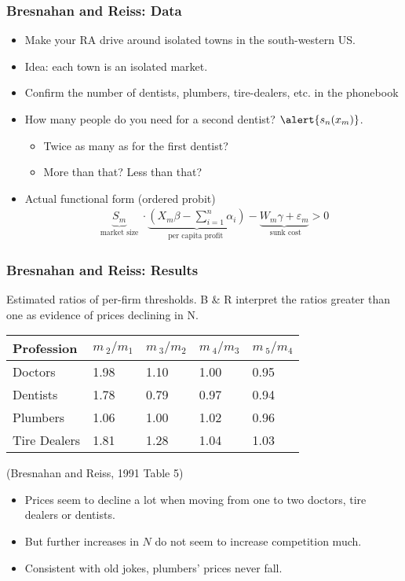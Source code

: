 \documentclass[xcolor=pdftex,dvipsnames,table,mathserif]{beamer}
\begin{document}
\begin{frame}
\frametitle{Bresnahan and Reiss: Data}
\begin{itemize}
\item Make your RA drive around isolated towns in the south-western US.
\item Idea: each town is an isolated market.
\item Confirm the number of dentists, plumbers, tire-dealers, etc. in the phonebook
\item How many people do you need for a second dentist? $\alert{s_n(x_m)}$.
\begin{itemize} 
\item Twice as many as for the first dentist?
\item More than that? Less than that?
\end{itemize}
\item Actual functional form (ordered probit)
\begin{eqnarray*}
\underbrace{S_m}_{\mbox{ market size } }\cdot \underbrace{\left(X_m \beta - \sum_{i=1}^n \alpha_i \right) }_{\mbox {per capita profit }} -\underbrace{ W_m \gamma + \varepsilon_m}_{\mbox { sunk cost}} > 0
\end{eqnarray*}

\end{itemize}
\end{frame}


\begin{frame}
\frametitle{Bresnahan and Reiss: Results}
Estimated ratios of per-firm thresholds. B \& R interpret the ratios greater
than one as evidence of prices declining in N.
\begin{center}
\begin{tabular}{|l|l|l|l|l|}
\hline
Profession & $m\,_{2}/m_{1}$ & $m\,_{3}/m_{2}$ & $m\,_{4}/m_{3}$ & $m\,_{5}/m_{4}$ \\ \hline
Doctors & 1.98 & 1.10 & 1.00 & 0.95 \\ \hline
Dentists & 1.78 & 0.79 & 0.97 & 0.94 \\ \hline
Plumbers & 1.06 & 1.00 & 1.02 & 0.96 \\ \hline
Tire Dealers & 1.81 & 1.28 & 1.04 & 1.03 \\ \hline
\end{tabular}
\end{center}
(Bresnahan and Reiss, 1991 Table 5\bigskip )
\begin{itemize}
\item Prices seem to decline a lot when moving from one to two doctors, tire
dealers or dentists.
\item But further increases in $N$ do not seem to increase competition much.
\item Consistent with old jokes, plumbers' prices never fall.
\end{itemize}
\end{frame}
\end{document}
